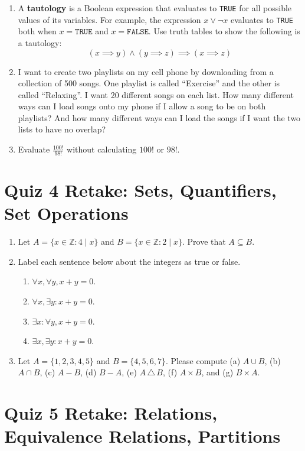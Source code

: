 \documentclass[11pt]{article}
\newcommand{\set}[1]{\{ #1 \}}
\begin{document}
\begin{enumerate}
\item A \textbf{tautology} is a Boolean expression that evaluates to \texttt{TRUE} for all possible values of its variables. For example, the expression $x \lor \lnot x$ evaluates to \texttt{TRUE} both when $x=\texttt{TRUE}$ and $x=\texttt{FALSE}$. Use truth tables to show the following is a tautology:
\[ (x \implies y) \land (y \implies z) \implies (x \implies z) \]
\item I want to create two playlists on my cell phone by downloading from a collection of 500 songs. One playlist is called ``Exercise'' and the other is called ``Relaxing''. I want 20 different songs on each list. How many different ways can I load songs onto my phone if I allow a song to be on both playlists? And how many different ways can I load the songs if I want the two lists to have no overlap?
\item Evaluate $\frac{100!}{98!}$ without calculating $100!$ or $98!$.
\end{enumerate}

\section*{Quiz 4 Retake: Sets, Quantifiers, Set Operations}

\begin{enumerate}
\item  Let $A= \set{x \in \mathbb{Z}: 4 \mid x}$ and $B= \set{x \in \mathbb{Z}: 2 \mid x}$. Prove that $A \subseteq B$.
\item Label each sentence below about the integers as true or false.
\begin{enumerate}
\item $\forall x, \forall y, x+y=0.$
\item $\forall x, \exists y: x+y=0.$
\item $\exists x: \forall y, x+y=0.$
\item $\exists x, \exists y: x+y=0.$
\end{enumerate}
\item Let $A=\set{1,2,3,4,5}$ and $B=\set{4,5,6,7}$. Please compute (a) $A \cup B$, (b) $A \cap B$, (c) $A - B$, (d) $B-A$, (e) $A \,\triangle\, B$, (f) $A \times B$, and (g) $B \times A$.
\end{enumerate}

\section*{Quiz 5 Retake: Relations, Equivalence Relations, Partitions}
\end{document}
